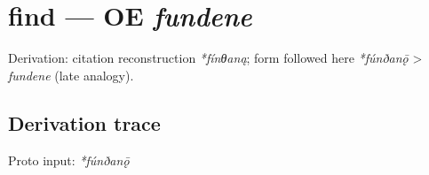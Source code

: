 \documentclass[
  british,
  a4paper,
  openany]{book}
\providecommand{\texorpdfstring}[2]{#1}
\begin{document}
\section{\texorpdfstring{find --- OE
\emph{fundene}}{find --- OE fundene}}\label{find-oe-fundene}


Derivation: citation reconstruction \emph{*fínθaną}; form followed here
\emph{*fúnðanǭ} \textgreater{} \emph{fundene} (late analogy).

\subsection{Derivation trace}\label{derivation-trace-112}

Proto input: \emph{*fúnðanǭ}

\begingroup
\setlength{\fboxsep}{6pt}
\end{document}
